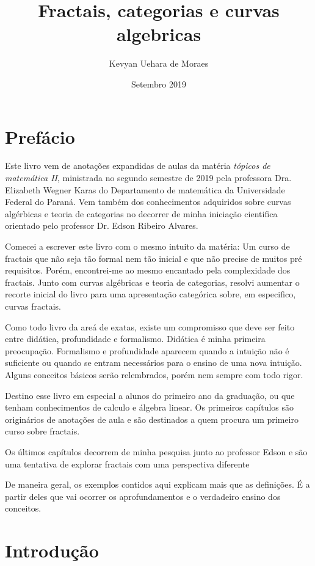 \documentclass[12pt]{report}
\title{Fractais, categorias e curvas algebricas}
\author{Kevyan Uehara de Moraes}
\date{Setembro 2019}
\theoremstyle{definition}
\begin{document}

\tableofcontents
\maketitle

\chapter*{Prefácio}\label{pre}

Este livro vem de anotações expandidas de aulas da matéria \textit{tópicos de matemática II}, ministrada no segundo semestre de 2019 pela professora Dra. Elizabeth Wegner Karas do Departamento de matemática da Universidade Federal do Paraná. Vem também dos conhecimentos adquiridos sobre curvas algérbicas e teoria de categorias no decorrer de minha iniciação cientifica orientado pelo professor Dr. Edson Ribeiro Alvares. 

Comecei a escrever este livro com o mesmo intuito da matéria: Um curso de fractais que não seja tão formal nem tão inicial e que não precise de muitos pré requisitos. Porém, encontrei-me ao mesmo encantado pela complexidade dos fractais. Junto com curvas algébricas e teoria de categorias, resolvi aumentar o recorte inicial do livro para uma apresentação categórica sobre, em especifico, curvas fractais.

Como todo livro da areá de exatas, existe um compromisso que deve ser feito entre didática, profundidade e formalismo. Didática é minha primeira preocupação. Formalismo e profundidade aparecem quando a intuição não é suficiente ou quando se entram necessários para o ensino de uma nova intuição. Alguns conceitos básicos serão relembrados, porém nem sempre com todo rigor.

Destino esse livro em especial a alunos do primeiro ano da graduação, ou que tenham conhecimentos de calculo e álgebra linear. Os primeiros capítulos são originários de anotações de aula e são destinados a quem procura um primeiro curso sobre fractais.

Os últimos capítulos decorrem de minha pesquisa junto ao professor Edson e são uma tentativa de explorar fractais com uma perspectiva diferente

De maneira geral, os exemplos contidos aqui explicam mais que as definições. É a partir deles que vai ocorrer os aprofundamentos e o verdadeiro ensino dos conceitos. 

\chapter{Introdução}
 
\end{document}
